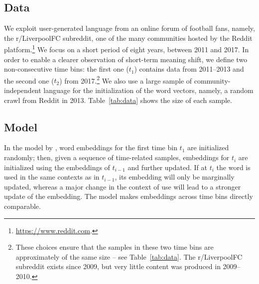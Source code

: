 
\subsection{Data}
\label{subsec:Data}
We exploit user-generated language from an online forum of football fans,
namely, the r/LiverpoolFC subreddit, one of the many communities hosted
by the Reddit platform.\footnote{\url{https://www.reddit.com}.}
We focus on a short period of eight years, between 2011 and 2017. 
In order to enable a clearer observation of short-term meaning shift, we define two
non-consecutive time bins: the first one ($t_1$) contains data from
2011--2013 and the second one ($t_2$) from 2017.\footnote{These choices
  ensure that the samples in these two time bins are approximately of the same size -- see Table~\ref{tab:data}. The
  r/LiverpoolFC subreddit exists since 2009, but very little content
  was produced in 2009--2010.}
 We also use a large sample of community-independent language for the
initialization of the word vectors, namely, a random crawl from Reddit
in 2013.
Table~\ref{tab:data} shows the size of each sample.



\subsection{Model}
\label{subsec:Model}

In the model by , word
embeddings for the first time bin $t_1$ are initialized randomly; then,
given a sequence of time-related samples, embeddings for $t_i$
are initialized using the embeddings of $t_{i-1}$ and further
updated. 
If at $t_i$ the word is used in the same contexts as in $t_{i-1}$, its embedding will only be marginally updated, whereas a major change in the context of use will lead to a stronger update of the embedding. The model makes embeddings across time bins directly comparable.

